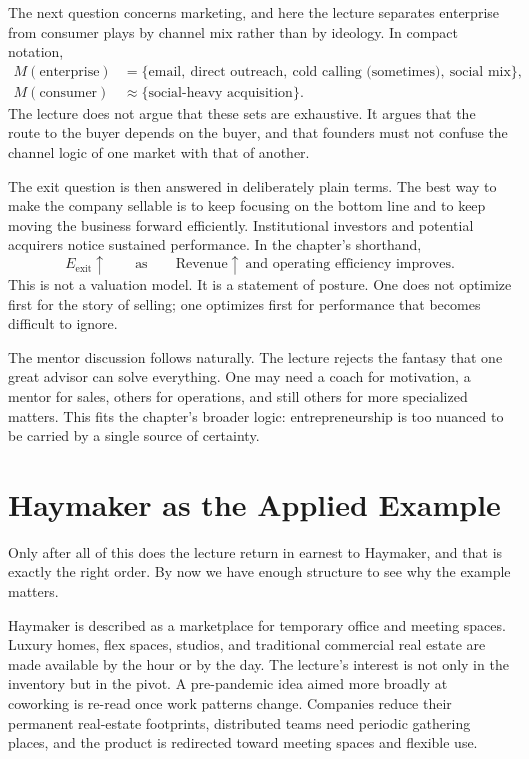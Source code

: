 The next question concerns marketing, and here the lecture separates enterprise from consumer plays by channel mix rather than by ideology. In compact notation,
\begin{align}
M(\text{enterprise}) &= \{\text{email},\ \text{direct outreach},\ \text{cold calling (sometimes)},\ \text{social mix}\},\\
M(\text{consumer}) &\approx \{\text{social-heavy acquisition}\}.
\end{align}
The lecture does not argue that these sets are exhaustive. It argues that the route to the buyer depends on the buyer, and that founders must not confuse the channel logic of one market with that of another.

The exit question is then answered in deliberately plain terms. The best way to make the company sellable is to keep focusing on the bottom line and to keep moving the business forward efficiently. Institutional investors and potential acquirers notice sustained performance. In the chapter's shorthand,
\begin{equation}
E_{\mathrm{exit}} \uparrow
\qquad \text{as} \qquad
\mathrm{Revenue} \uparrow \ \text{and operating efficiency improves}.
\end{equation}
This is not a valuation model. It is a statement of posture. One does not optimize first for the story of selling; one optimizes first for performance that becomes difficult to ignore.

The mentor discussion follows naturally. The lecture rejects the fantasy that one great advisor can solve everything. One may need a coach for motivation, a mentor for sales, others for operations, and still others for more specialized matters. This fits the chapter's broader logic: entrepreneurship is too nuanced to be carried by a single source of certainty.

\section{Haymaker as the Applied Example}

Only after all of this does the lecture return in earnest to Haymaker, and that is exactly the right order. By now we have enough structure to see why the example matters.

Haymaker is described as a marketplace for temporary office and meeting spaces. Luxury homes, flex spaces, studios, and traditional commercial real estate are made available by the hour or by the day. The lecture's interest is not only in the inventory but in the pivot. A pre-pandemic idea aimed more broadly at coworking is re-read once work patterns change. Companies reduce their permanent real-estate footprints, distributed teams need periodic gathering places, and the product is redirected toward meeting spaces and flexible use.

